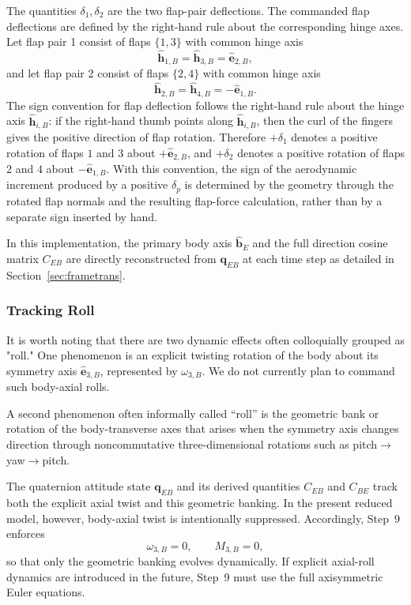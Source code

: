 The quantities \(\delta_1,\delta_2\) are the two flap-pair deflections. The commanded flap deflections are defined by the right-hand rule about the corresponding hinge axes. Let flap pair 1 consist of flaps \(\{1,3\}\) with common hinge axis
\begin{equation}
\hat{\mathbf h}_{1,B}=\hat{\mathbf h}_{3,B}=\hat{\mathbf e}_{2,B},
\end{equation}
and let flap pair 2 consist of flaps \(\{2,4\}\) with common hinge axis
\begin{equation}
\hat{\mathbf h}_{2,B}=\hat{\mathbf h}_{4,B}=-\hat{\mathbf e}_{1,B}.
\end{equation}
The sign convention for flap deflection follows the right-hand rule about the hinge axis \(\hat{\mathbf h}_{i,B}\): if the right-hand thumb points along \(\hat{\mathbf h}_{i,B}\), then the curl of the fingers gives the positive direction of flap rotation. Therefore \(+\delta_1\) denotes a positive rotation of flaps \(1\) and \(3\) about \(+\hat{\mathbf e}_{2,B}\), and \(+\delta_2\) denotes a positive rotation of flaps \(2\) and \(4\) about \(-\hat{\mathbf e}_{1,B}\). With this convention, the sign of the aerodynamic increment produced by a positive \(\delta_p\) is determined by the geometry through the rotated flap normals and the resulting flap-force calculation, rather than by a separate sign inserted by hand.

In this implementation, the primary body axis \(\hat{\mathbf b}_E\) and the full direction cosine matrix \(C_{EB}\) are directly reconstructed from \(\mathbf q_{EB}\) at each time step as detailed in Section~\ref{sec:frametrans}.

\subsubsection{Tracking Roll}
It is worth noting that there are two dynamic effects often colloquially grouped as "roll." One phenomenon is an explicit twisting rotation of the body about its symmetry axis \(\hat{\mathbf e}_{3,B}\), represented by \(\omega_{3,B}\). We do not currently plan to command such body-axial rolls.

A second phenomenon often informally called ``roll'' is the geometric bank or rotation of the body-transverse axes that arises when the symmetry axis changes direction through noncommutative three-dimensional rotations such as pitch$\longrightarrow$yaw$\longrightarrow$pitch. 

The quaternion attitude state \(\mathbf q_{EB}\) and its derived quantities $C_{EB}$ and $C_{BE}$ track both the explicit axial twist and this geometric banking. In the present reduced model, however, body-axial twist is intentionally suppressed. Accordingly, Step~9 enforces
\[
\omega_{3,B}=0,
\qquad
M_{3,B}=0,
\]
so that only the geometric banking evolves dynamically. If explicit axial-roll dynamics are introduced in the future, Step~9 must use the full axisymmetric Euler equations.

